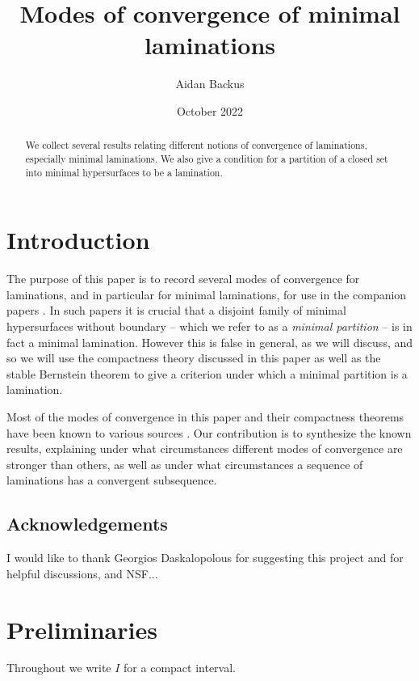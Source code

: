 \documentclass[reqno,11pt]{amsart}
\title{Modes of convergence of minimal laminations}
\author{Aidan Backus}
\date{October 2022}
\newcommand{\dfn}[1]{\emph{#1}\index{#1}}
\theoremstyle{definition}
\numberwithin{equation}{section}
\begin{document}
\begin{abstract}
We collect several results relating different notions of convergence of laminations, especially minimal laminations.
We also give a condition for a partition of a closed set into minimal hypersurfaces to be a lamination.
\end{abstract}

\maketitle



\section{Introduction}
The purpose of this paper is to record several modes of convergence for laminations, and in particular for minimal laminations, for use in the companion papers \cite{BackusFLG, DaskalopoulosPrep2}.
In such papers it is crucial that a disjoint family of minimal hypersurfaces without boundary -- which we refer to as a \dfn{minimal partition} -- is in fact a minimal lamination.
However this is false in general, as we will discuss, and so we will use the compactness theory discussed in this paper as well as the stable Bernstein theorem \cite{Schoen2016, Chodosh2021} to give a criterion under which a minimal partition is a lamination.

Most of the modes of convergence in this paper and their compactness theorems have been known to various sources \cite{ColdingMinicozziIV, ColdingMinicozziV, thurston1979geometry}.
Our contribution is to synthesize the known results, explaining under what circumstances different modes of convergence are stronger than others, as well as under what circumstances a sequence of laminations has a convergent subsequence.


\subsection{Acknowledgements}
I would like to thank Georgios Daskalopolous for suggesting this project and for helpful discussions, and NSF...


\section{Preliminaries}
Throughout we write $I$ for a compact interval.
\end{document}

